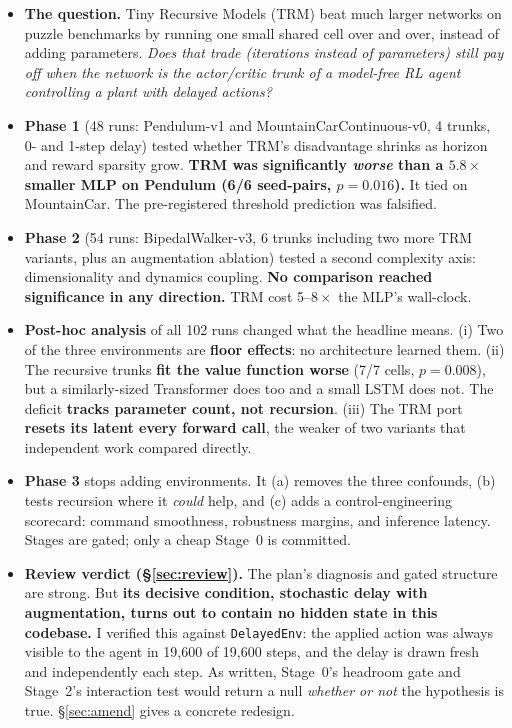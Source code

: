 \documentclass[11pt]{article}
\begin{document}
\begin{itemize}
  \item \textbf{The question.} Tiny Recursive Models (TRM) beat much larger networks on puzzle benchmarks by running one small shared cell over and over, instead of adding parameters. \emph{Does that trade (iterations instead of parameters) still pay off when the network is the actor/critic trunk of a model-free RL agent controlling a plant with delayed actions?}
  \item \textbf{Phase 1} (48 runs: Pendulum-v1 and MountainCarContinuous-v0, 4 trunks, 0- and 1-step delay) tested whether TRM's disadvantage shrinks as horizon and reward sparsity grow. \textbf{TRM was significantly \emph{worse} than a $5.8\times$ smaller MLP on Pendulum (6/6 seed-pairs, $p=0.016$).} It tied on MountainCar. The pre-registered threshold prediction was falsified.
  \item \textbf{Phase 2} (54 runs: BipedalWalker-v3, 6 trunks including two more TRM variants, plus an augmentation ablation) tested a second complexity axis: dimensionality and dynamics coupling. \textbf{No comparison reached significance in any direction.} TRM cost 5--$8\times$ the MLP's wall-clock.
  \item \textbf{Post-hoc analysis} of all 102 runs changed what the headline means. (i) Two of the three environments are \textbf{floor effects}: no architecture learned them. (ii) The recursive trunks \textbf{fit the value function worse} (7/7 cells, $p=0.008$), but a similarly-sized Transformer does too and a small LSTM does not. The deficit \textbf{tracks parameter count, not recursion}. (iii) The TRM port \textbf{resets its latent every forward call}, the weaker of two variants that independent work compared directly.
  \item \textbf{Phase 3} stops adding environments. It (a) removes the three confounds, (b) tests recursion where it \emph{could} help, and (c) adds a control-engineering scorecard: command smoothness, robustness margins, and inference latency. Stages are gated; only a cheap Stage~0 is committed.
  \item \textbf{Review verdict (\S\ref{sec:review}).} The plan's diagnosis and gated structure are strong. But \textbf{its decisive condition, stochastic delay with augmentation, turns out to contain no hidden state in this codebase.} I verified this against \texttt{DelayedEnv}: the applied action was always visible to the agent in 19{,}600 of 19{,}600 steps, and the delay is drawn fresh and independently each step. As written, Stage~0's headroom gate and Stage~2's interaction test would return a null \emph{whether or not} the hypothesis is true. \S\ref{sec:amend} gives a concrete redesign.
\end{itemize}
\end{document}
